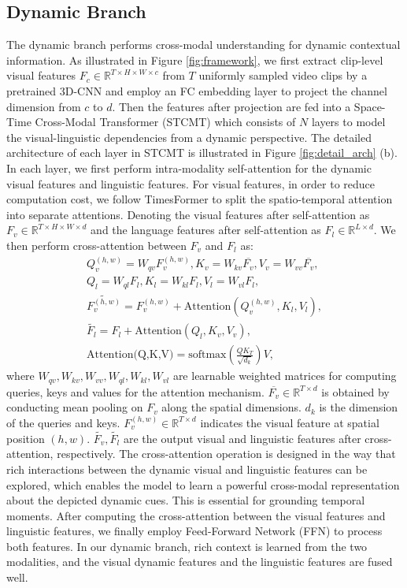 \documentclass[sigconf]{acmart}
\begin{document}
\subsection{Dynamic Branch}
The dynamic branch performs cross-modal understanding for dynamic contextual information. As illustrated in Figure \ref{fig:framework}, we first extract clip-level visual features $F_{c} \in \mathbb{R}^{T\times H \times W \times c}$ from $T$ uniformly sampled video clips by a pretrained 3D-CNN\cite{slowfast} and employ an FC embedding layer to project the channel dimension from $c$ to $d$. Then the features after projection are fed into a Space-Time Cross-Modal Transformer (STCMT) which consists of $N$ layers to model the visual-linguistic dependencies from a dynamic perspective. The detailed architecture of each layer in STCMT is illustrated in Figure \ref{fig:detail_arch} (b). In each layer, we first perform intra-modality self-attention for the dynamic visual features and linguistic features. For visual features, in order to reduce computation cost, we follow TimesFormer\cite{TimesFormer} to split the spatio-temporal attention into separate attentions. Denoting the visual features after self-attention as $F_v \in \mathbb{R}^{T\times H\times W\times d}$ and the language features after self-attention as $F_l \in \mathbb{R}^{L\times d}$. We then perform cross-attention between $F_v$ and $F_l$ as: 
\begin{align}
  Q_v^{(h,w)} = W_{qv}F_v^{(h,w)}, K_v= W_{kv}\overline{F_v}, V_v=W_{vv}\overline{F_v}, \nonumber \\ \nonumber
  Q_l = W_{ql}F_l, K_l = W_{kl}F_l, V_l=W_{vl}F_l, \\
  \widetilde{F_v^{(h,w)}} = F_v^{(h,w)} + \text{Attention}(Q_v^{(h,w)}, K_l, V_l),  \\
  \widetilde{F_l} = F_l +  \text{Attention}(Q_l, K_v, V_v), \nonumber\\
  \text{Attention(Q,K,V)} = \text{softmax}(\frac{QK_T}{\sqrt{d_k}})V, \nonumber
\end{align}
where $W_{qv}, W_{kv}, W_{vv}, W_{ql}, W_{kl}, W_{vl}$ are learnable weighted matrices for computing queries, keys and values for the attention mechanism. $\overline{F_v} \in \mathbb{R}^{T\times d}$ is obtained by conducting mean pooling on $F_v$ along the spatial dimensions. $d_k$ is the dimension of the queries and keys. $F_v^{(h,w)} \in \mathbb{R}^{T\times d}$ indicates the visual feature at spatial position $(h,w)$. $\widetilde{F_v}, \widetilde{F_l}$ are the output visual and linguistic features after cross-attention, respectively. The cross-attention operation is designed in the way that rich interactions between the dynamic visual and linguistic features can be explored, which enables the model to learn a powerful cross-modal representation about the depicted dynamic cues. This is essential for grounding temporal moments. After computing the cross-attention between the visual features and linguistic features, we finally employ Feed-Forward Network (FFN) to process both features. In our dynamic branch, rich context is learned from the two modalities, and the visual dynamic features and the linguistic features are fused well.
\end{document}
